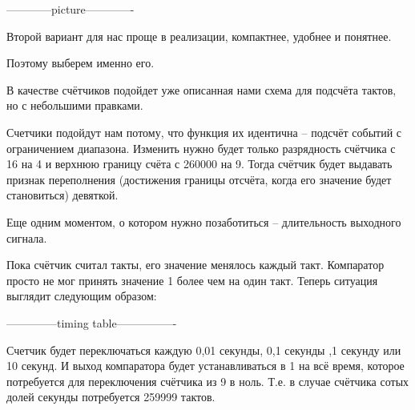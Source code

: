 \par{------------picture-------------}

\par{Второй вариант для нас проще в реализации, компактнее, удобнее и понятнее.}

\par{Поэтому выберем именно его.}

\par{В качестве счётчиков подойдет уже описанная нами схема для подсчёта тактов, но с небольшими правками.}

\par{Счетчики подойдут нам потому, что функция их идентична – подсчёт событий с ограничением диапазона. Изменить нужно будет только разрядность счётчика с 16 на 4 и верхнюю границу счёта с 260000 на 9. Тогда счётчик будет выдавать признак переполнения (достижения границы отсчёта, когда его значение будет становиться) девяткой.}

\par{Еще одним моментом, о котором нужно позаботиться – длительность выходного сигнала.}

\par{Пока счётчик считал такты, его значение менялось каждый такт. Компаратор просто не мог принять значение 1 более чем на один такт. Теперь ситуация выглядит следующим образом:}

\par{--------------timing table----------------}

\par{Счетчик будет переключаться каждую 0,01 секунды, 0,1 секунды ,1 секунду или 10 секунд. И выход компаратора будет устанавливаться в 1 на всё время, которое потребуется для переключения счётчика из 9 в ноль. Т.е. в случае счётчика сотых долей секунды потребуется 259999 тактов.}

